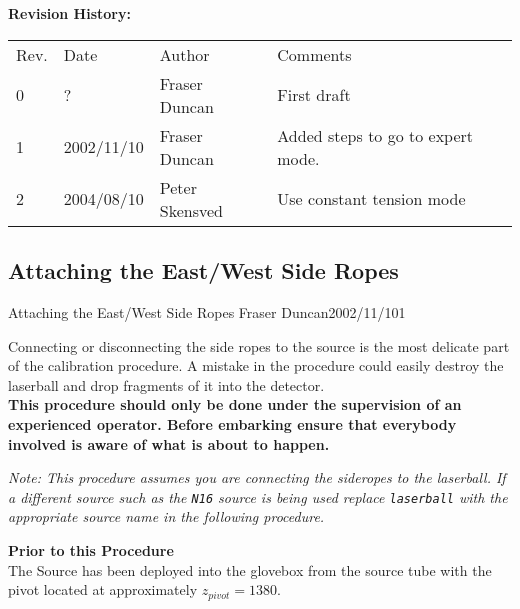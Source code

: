 {\small
~\\
~\\
\noindent
{\bf Revision History:}\\
\begin{tabular}{llll}
Rev. & Date & Author & Comments\\
0           &  ?           &  Fraser Duncan & \parbox[t]{3.0in}{   First draft }  \\

1             & 2002/11/10    & Fraser Duncan &  \parbox[t]{3.0in}
                                           {   Added steps to go to expert mode. }\\
2          &   2004/08/10 & Peter Skensved & \parbox[t]{3.0in}
     {  Use constant tension mode }\\

\end{tabular}
}







\newpage
\subsection{Attaching the East/West Side Ropes}
             {Attaching the East/West Side Ropes}
             {Fraser Duncan}{2002/11/10}{1}
 
  Connecting or disconnecting the side ropes to the source is the most
delicate part of the calibration procedure.  A mistake
in the procedure could easily destroy the laserball and
drop fragments of it into the detector.  \\
{\bf
This procedure should only be done under the supervision of
an experienced operator. Before embarking ensure that everybody involved
is aware of what is about to happen. 
}

\noindent
{\em Note:  This procedure assumes you are connecting the sideropes
  to the laserball.  If a different source such as the {\tt N16} source
  is being used replace {\tt laserball} with the appropriate source
  name in  the  following procedure.
}
  
\vspace*{0.25in}
\noindent
{\bf Prior to this Procedure}\\
The Source has been deployed into the glovebox from the source
tube with the pivot located at approximately $z_{pivot} = 1380$.

